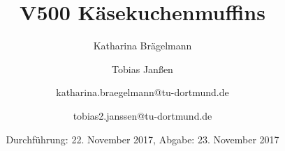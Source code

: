 
\title{V500 Käsekuchenmuffins}
\author{Katharina Brägelmann \and Tobias Janßen \and katharina.braegelmann@tu-dortmund.de \and tobias2.janssen@tu-dortmund.de}
\date{Durchführung: 22. November 2017, Abgabe: 23. November 2017}
\maketitle

\tableofcontents
